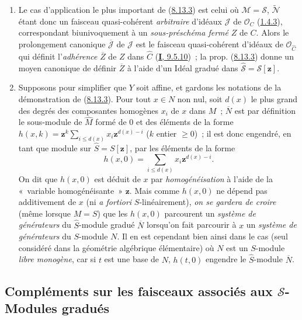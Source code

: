 \begin{remark}[8.13.4]
\label{II.8.13.4-fr}
\begin{enumerate}
  \item[\rm{(i)}] Le cas d'application le plus important de
  (\hyperref[II.8.13.3-fr]{8.13.3}) est celui où
  $\mathcal{M}=\mathcal{S}$, $\widetilde{\mathcal{N}}$ étant donc un faisceau
  quasi-cohérent \emph{arbitraire} d'idéaux $\mathcal{J}$ de
  $\mathcal{O}_C$ (\hyperref[II.1.4.3-fr]{1.4.3}), correspondant
  biunivoquement à un \emph{sous-préschéma fermé} $Z$ de $C$. Alors le
  prolongement canonique $\overline{\mathcal{J}}$ de $\mathcal{J}$ est le
  faisceau quasi-cohérent d'idéaux de $\mathcal{O}_{\widehat{C}}$ qui définit
  l'\emph{adhérence} $\overline{Z}$ de $Z$ dans $\widehat{C}$
  (\hyperref[I.9.5.10-fr]{\textbf{I}, 9.5.10})~; la prop.
  (\hyperref[II.8.13.3-fr]{8.13.3}) donne un moyen canonique de définir
  $\overline{Z}$ à l'aide d'un Idéal gradué dans
  $\widehat{\mathcal{S}}=\mathcal{S}[\mathbf{z}]$.
  \item[\rm{(ii)}] Supposons pour simplifier que $Y$ soit affine, et gardons
  les notations de la démonstration de
  (\hyperref[II.8.13.3-fr]{8.13.3}). Pour tout $x\in N$ non nul, soit $d(x)$
  le plus grand des degrés des composantes homogènes $x_i$ de $x$ dans $M$~;
  $\overline{N}$ est par définition le sous-module de $\widehat{M}$ formé de
  $0$ et des éléments de la forme
  $h(x,k)=\mathbf{z}^k\sum_{i\leqslant d(x)}x_i \mathbf{z}^{d(x)-i}$ ($k$ entier
  $\geqslant0$)~; il est donc engendré, en tant que module sur
  $\widehat{S}=S[\mathbf{z}]$, par les éléments de la forme
  \[
    h(x,0)=\sum_{i\leqslant d(x)}x_i \mathbf{z}^{d(x)-i}.
  \]
  On dit que $h(x,0)$ est déduit de $x$ par \emph{homogénéisation} à l'aide
  de la «~variable homogénéisante~» $\mathbf{z}$. Mais comme $h(x,0)$ ne dépend pas
  additivement de $x$ (ni \emph{a fortiori} $S$-linéairement), \emph{on se
  gardera de croire} (même lorsque $M=S$) que les $h(x,0)$ parcourent un
  \emph{système de générateurs} du $\widehat{S}$-module gradué
  $\overline{N}$ lorsqu'on fait parcourir à $x$ un \emph{système de
  générateurs} du $S$-module $N$. Il en est cependant bien ainsi dans le cas
  (seul considéré dans la géométrie algébrique élémentaire) où $N$ est un
  $S$-module \emph{libre monogène}, car si $t$ est une base de $N$, $h(t,0)$
  engendre le $\widehat{S}$-module $\overline{N}$.
\end{enumerate}
\end{remark}

\subsection{Compléments sur les faisceaux associés aux
$\mathcal{S}$-Modules gradués}
\label{subsection:II.8.14-fr}

